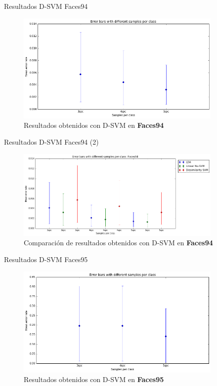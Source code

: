 \documentclass{beamer}
\begin{document}
\begin{frame}{Resultados D-SVM Faces94}
\begin{figure}[htpb!]
\centering
\includegraphics[width=10cm]{dsvm_res94}
\caption{Resultados obtenidos con D-SVM en \textbf{Faces94}}
\end{figure}
\end{frame}

\begin{frame}{Resultados D-SVM Faces94 (2)}
\begin{figure}[htpb!]
\centering
\includegraphics[width=10cm]{dsvm_rescomp94}
\caption{Comparación de resultados obtenidos con D-SVM en \textbf{Faces94}}
\end{figure}
\end{frame}

\begin{frame}{Resultados D-SVM Faces95}
\begin{figure}[htpb!]
\centering
\includegraphics[width=10cm]{dsvm_res95}
\caption{Resultados obtenidos con D-SVM en \textbf{Faces95}}
\end{figure}
\end{frame}
\end{document}
